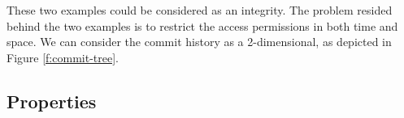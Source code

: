 \iffalse
\fi



These two examples could be considered as an integrity. The problem resided
behind the two examples is to restrict the access permissions in both time and
space. We can consider the commit history as a 2-dimensional, as depicted
in Figure \ref{f:commit-tree}.



\subsection{Properties}


